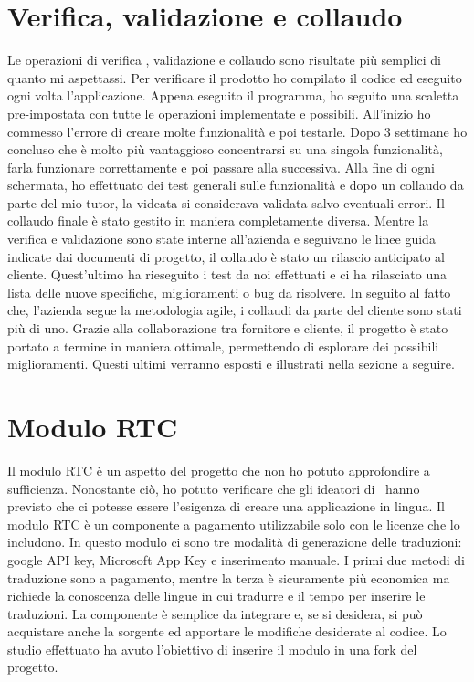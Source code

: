 \section{Verifica, validazione e collaudo}
Le operazioni di verifica , validazione e collaudo sono risultate più semplici di quanto mi aspettassi. Per verificare il prodotto ho compilato il codice ed eseguito ogni volta l'applicazione. 
Appena eseguito il programma, ho seguito una scaletta pre-impostata con tutte le operazioni implementate e possibili. All'inizio ho commesso l'errore di creare molte funzionalità e poi testarle. Dopo 3 settimane ho concluso che è molto più vantaggioso concentrarsi su una singola funzionalità, farla funzionare correttamente e poi passare alla successiva.
Alla fine di ogni schermata, ho effettuato dei test generali sulle funzionalità e dopo un collaudo da parte del mio tutor, la videata  si considerava validata salvo eventuali errori.  
Il collaudo finale è stato gestito in maniera completamente diversa. Mentre la verifica e validazione sono state interne all'azienda e seguivano le linee guida indicate dai documenti di progetto, il collaudo è stato un rilascio anticipato al cliente. Quest'ultimo ha rieseguito i test da noi effettuati e ci ha rilasciato una lista delle nuove specifiche, miglioramenti o bug da risolvere. 
In seguito al fatto che, l'azienda segue la metodologia agile, i collaudi da parte del cliente sono stati più di uno. Grazie alla collaborazione tra fornitore e cliente, il progetto è stato portato a termine in maniera ottimale, permettendo di esplorare dei possibili miglioramenti.
Questi ultimi verranno esposti e illustrati nella sezione a seguire.

\section{Modulo RTC}
Il modulo RTC è un aspetto del progetto che non ho potuto approfondire a sufficienza. Nonostante ciò, ho potuto verificare che gli ideatori di \inde\ hanno previsto che ci potesse essere l'esigenza di creare una applicazione in lingua.
Il modulo RTC è un componente a pagamento utilizzabile solo con le licenze che lo includono. In questo modulo ci sono tre modalità di generazione delle traduzioni: google API key, Microsoft App Key e inserimento manuale. 
I primi due metodi di traduzione sono a pagamento, mentre la terza è sicuramente più economica ma richiede la conoscenza delle lingue in cui tradurre e il tempo per inserire le traduzioni.
La componente è semplice da integrare e, se si desidera, si può acquistare anche la sorgente ed apportare le modifiche desiderate al codice.
Lo studio effettuato ha avuto l'obiettivo di inserire il modulo in una fork del progetto.

